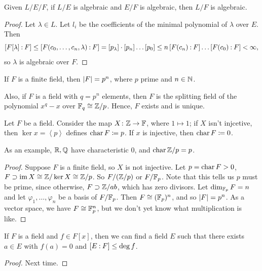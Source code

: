 \begin{theorem}
    Given $L/E/F$, if $L/E$ is algebraic and $E/F$ is algebraic, then $L/F$ is algebraic.
\end{theorem}
\begin{proof}
    Let $\lambda \in L$. Let $l_i$ be the coefficients of the minimal polynomial of $\lambda$ over $E$. Then
    \[ \coor{F[\lambda] : F} \leq \coor{F(c_0, \dots, c_n, \lambda) : F} = [p_\lambda] \cdot [p_n] \dots [p_0] \leq n \coor{F(c_n):F} \dots \coor{F(c_0):F} < \infty, \]
    so $\lambda$ is algebraic over $F$.
\end{proof}
\begin{theorem}
    \begin{parlist} \item If $F$ is a finite field, then $\left\lvert F \right\rvert = p^n$, where $p$ prime and $n \in \mathbb N$. \item Also, if $F$ is a field with $q = p^n$ elements, then $F$ is the splitting field of the polynomial $x^q - x$ over $\mathbb F_q \cong \mathbb Z/p$. Hence, $F$ exists and is unique. \end{parlist}
\end{theorem}
\begin{definition}
    Let $F$ be a field. Consider the map $X \colon \mathbb Z \to \mathbb F$, where $1 \mapsto 1$; if $X$ isn't injcetive, then $\ker x = \left<p\right>$ defines $\operatorname{char} F \coloneq p$. If $x$ is injective, then $\operatorname{char} F \coloneq 0$.
\end{definition}
As an example, $\mathbb R, \mathbb Q$ have characteristic $0$, and $\operatorname{char} \mathbb Z/p = p$.
\begin{proof}
    Suppose $F$ is a finite field, so $X$ is not injective. Let $p = \operatorname{char} F > 0$, $F \supset \operatorname{im} X \cong \mathbb Z/\ker X \cong \mathbb Z/p$. So $F/(\mathbb Z/p)$ or $F/\mathbb F_p$. Note that this tells us $p$ must be prime, since otherwise, $F \supset \mathbb Z/{ab}$, which has zero divisors. Let $\dim_{\mathbb F_p} F = n$ and let $\varphi_1, \dots, \varphi_n$ be a basis of $F/\mathbb F_p$. Then $F \cong (\mathbb F_p)^n$, and so $\left\lvert F \right\rvert = p^n$. As a vector space, we have $F \cong \mathbb F_p^n$, but we don't yet know what multiplication is like.
\end{proof}
\begin{theorem}
    If $F$ is a field and $f \in F[x]$, then we can find a field $E$ such that there exists $a \in E$ with $f(a) = 0$ and $\coor{E:F} \leq \deg f$.
\end{theorem}
\begin{proof}
    Next time.
\end{proof}
